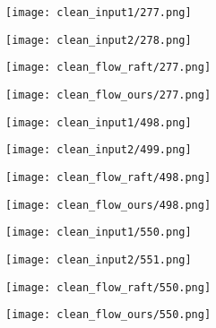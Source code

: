 \documentclass[10pt,twocolumn,letterpaper]{article}
\begin{document}
\begin{figure*}[ht!]
     \begin{subfigure}[b]{0.245\textwidth}
         \centering
         \texttt{[image: clean\_input1/277.png]}
     \end{subfigure}\hfill
     \begin{subfigure}[b]{0.245\textwidth}
         \centering
         \texttt{[image: clean\_input2/278.png]}
     \end{subfigure}\hfill
     \begin{subfigure}[b]{0.245\textwidth}
         \centering
         \texttt{[image: clean\_flow\_raft/277.png]}
     \end{subfigure}\hfill
     \begin{subfigure}[b]{0.245\textwidth}
         \centering
         \texttt{[image: clean\_flow\_ours/277.png]}
     \end{subfigure}

     \begin{subfigure}[b]{0.245\textwidth}
         \centering
         \texttt{[image: clean\_input1/498.png]}
     \end{subfigure}\hfill
     \begin{subfigure}[b]{0.245\textwidth}
         \centering
         \texttt{[image: clean\_input2/499.png]}
     \end{subfigure}\hfill
     \begin{subfigure}[b]{0.245\textwidth}
         \centering
         \texttt{[image: clean\_flow\_raft/498.png]}
     \end{subfigure}\hfill
     \begin{subfigure}[b]{0.245\textwidth}
         \centering
         \texttt{[image: clean\_flow\_ours/498.png]}
     \end{subfigure}

     
     \begin{subfigure}[b]{0.245\textwidth}
         \centering
         \texttt{[image: clean\_input1/550.png]}
     \end{subfigure}\hfill
     \begin{subfigure}[b]{0.245\textwidth}
         \centering
         \texttt{[image: clean\_input2/551.png]}
     \end{subfigure}\hfill
     \begin{subfigure}[b]{0.245\textwidth}
         \centering
         \texttt{[image: clean\_flow\_raft/550.png]}
     \end{subfigure}\hfill
     \begin{subfigure}[b]{0.245\textwidth}
         \centering
         \texttt{[image: clean\_flow\_ours/550.png]}
     \end{subfigure}


\end{figure*}
\end{document}
